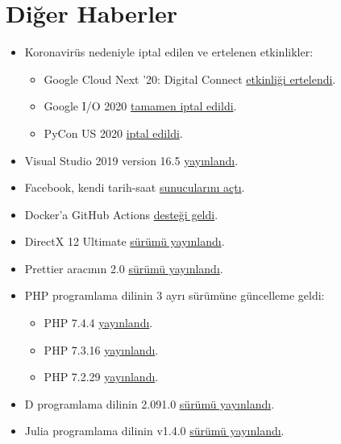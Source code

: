 \documentclass[11pt]{article}
\begin{document}
\section{Diğer Haberler}
\label{sec:org09f9ee7}
\begin{itemize}
\item Koronavirüs nedeniyle iptal edilen ve ertelenen etkinlikler:
\begin{itemize}
\item Google Cloud Next '20: Digital Connect \href{https://cloud.google.com/blog/topics/inside-google-cloud/postponing-google-cloud-next20-digital-connect}{etkinliği ertelendi}.
\item Google I/O 2020 \href{https://www.theverge.com/2020/3/20/21188669/google-i-o-canceled-2020-coronavirus-pandemic}{tamamen iptal edildi}.
\item PyCon US 2020 \href{https://pycon.blogspot.com/2020/03/pycon-us-2020-in-pittsburgh.html?m=1}{iptal edildi}.
\end{itemize}
\item Visual Studio 2019 version 16.5 \href{https://devblogs.microsoft.com/visualstudio/visual-studio-2019-version-16-5/}{yayınlandı}.
\item Facebook, kendi tarih-saat \href{https://engineering.fb.com/production-engineering/ntp-service/}{sunucularını açtı}.
\item Docker'a GitHub Actions \href{https://www.docker.com/blog/first-docker-github-action-is-here/}{desteği geldi}.
\item DirectX 12 Ultimate \href{https://devblogs.microsoft.com/directx/announcing-directx-12-ultimate/}{sürümü yayınlandı}.
\item Prettier aracının 2.0 \href{https://prettier.io/blog/2020/03/21/2.0.0.html}{sürümü yayınlandı}.
\item PHP programlama dilinin 3 ayrı sürümüne güncelleme geldi:
\begin{itemize}
\item PHP 7.4.4 \href{https://www.php.net/ChangeLog-7.php\#7.4.4}{yayınlandı}.
\item PHP 7.3.16 \href{https://www.php.net/ChangeLog-7.php\#7.3.16}{yayınlandı}.
\item PHP 7.2.29 \href{http://www.php.net/ChangeLog-7.php\#7.2.29}{yayınlandı}.
\end{itemize}
\item D programlama dilinin 2.091.0 \href{https://dlang.org/blog/2020/03/17/d-2-091-0-released/}{sürümü yayınlandı}.
\item Julia programlama dilinin v1.4.0 \href{https://discourse.julialang.org/t/julia-v1-4-0-has-been-released/36324}{sürümü yayınlandı}.

\end{itemize}
\end{document}
